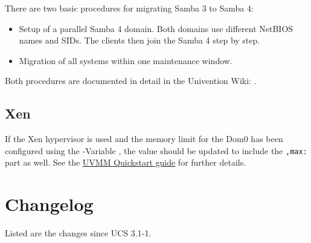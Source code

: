 There are two basic procedures for migrating Samba 3 to Samba 4:

\begin{itemize}
\item Setup of a parallel Samba 4 domain. Both domains use different
NetBIOS names and SIDs. The clients then join the Samba 4 step by
step.
\item Migration of all systems within one maintenance window.
\end{itemize}

Both procedures are documented in detail in the Univention Wiki:
.

\section{Xen} %
If the Xen hypervisor is used and the memory limit for the Dom0 has been configured using the \ucsUCR{}-Variable , the value should be updated to include the \texttt{,max:} part as well.
See the \href{http://wiki.univention.de/index.php?title=UVMM_Quickstart-3.1/en#Configuring_the_Dom0}{UVMM Quickstart guide} for further details.

\chapter{Changelog}

Listed are the changes since UCS 3.1-1.






